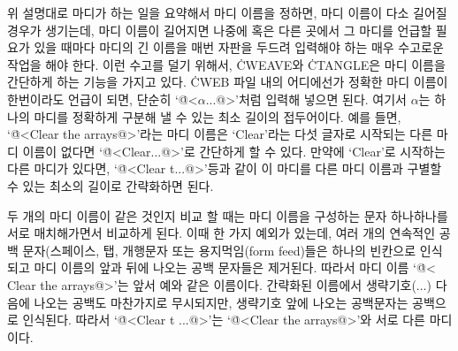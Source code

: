 위 설명대로 마디가 하는 일을 요약해서 마디 이름을
정하면, 마디 이름이 다소 길어질 경우가 생기는데, 마디 이름이
길어지면 나중에 혹은 다른 곳에서 그 마디를 언급할 필요가 있을 때마다
마디의 긴 이름을 매번 자판을 두드려 입력해야 하는 매우
수고로운 작업을 해야 한다. 이런 수고를 덜기 위해서, \.{CWEAVE}와
\.{CTANGLE}은 마디 이름을 간단하게 하는 기능을 가지고 있다. \.{CWEB}
파일 내의 어디에선가 정확한 마디 이름이 한번이라도 언급이 되면, 단순히
`\.{@<$\alpha$...@>}'처럼 입력해 넣으면 된다. 여기서 $\alpha$는 하나의
마디를 정확하게 구분해 낼 수 있는 최소 길이의 접두어이다.
예를 들면, `\.{@<Clear the arrays@>}'라는 마디 이름은 `Clear'라는
다섯 글자로 시작되는 다른 마디 이름이 없다면 `\.{@<Clear...@>}'로
간단하게 할 수 있다. 만약에 `Clear'로 시작하는 다른 마디가 있다면,
`\.{@<Clear t...@>}'등과 같이 이 마디를 다른 마디 이름과 구별할 수
있는 최소의 길이로 간략화하면 된다.

두 개의 마디 이름이 같은 것인지 비교 할 때는 마디 이름을 구성하는
문자 하나하나를 서로 매치해가면서 비교하게 된다. 이때 한 가지
예외가 있는데, 여러 개의 연속적인 공백 문자(스페이스, 탭, 개행문자
또는 용지먹임(form feed)들은 하나의 빈칸으로 인식되고 마디 이름의 앞과
뒤에 나오는 공백 문자들은 제거된다. 따라서 마디 이름 `\.{@< Clear the
arrays@>}'는 앞서 예와 같은 이름이다. 간략화된
이름에서 생략기호($\ldots$) 다음에 나오는 공백도 마찬가지로 무시되지만,
생략기호 앞에 나오는 공백문자는 공백으로 인식된다. 따라서
`\.{@<Clear t ...@>}'는 `\.{@<Clear the arrays@>}'와 서로 다른 마디이다.

